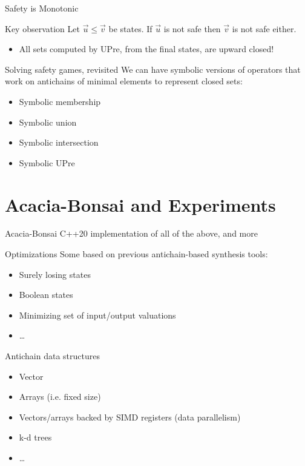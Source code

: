 \documentclass[aspectratio=169]{beamer}
\begin{document}
\begin{frame}{Safety is Monotonic}
  \begin{block}{Key observation}
    Let $\vec{u} \leq \vec{v}$ be states. If $\vec{u}$ is \alert{not safe} then
    $\vec{v}$ is not safe either.
    \begin{itemize}
      \item All sets computed by UPre, from the final states, are \alert{upward
        closed}!
    \end{itemize}
  \end{block}
  \pause
  \begin{block}{Solving safety games, revisited}
    We can have \alert{symbolic} versions of operators that work on
    antichains of \alert{minimal elements} to represent closed sets:
    \begin{itemize}
      \item Symbolic membership
      \item Symbolic union
      \item Symbolic intersection
      \item Symbolic UPre
    \end{itemize}
  \end{block}
\end{frame}

\section{Acacia-Bonsai and Experiments}


\begin{frame}{Acacia-Bonsai}
  C++20 implementation of all of the above, and more

  \begin{block}{Optimizations}
    Some based on previous antichain-based synthesis tools:
    \begin{itemize}
      \item Surely losing states
      \item Boolean states
      \item Minimizing set of input/output valuations
      \item \dots
    \end{itemize}
  \end{block}

  \pause
  \begin{block}{Antichain data structures}
    \begin{itemize}
      \item Vector
      \item Arrays (i.e. fixed size)
      \item Vectors/arrays backed by SIMD registers (data parallelism)
      \item k-d trees
      \item \dots
    \end{itemize}
  \end{block}
\end{frame}
\end{document}
